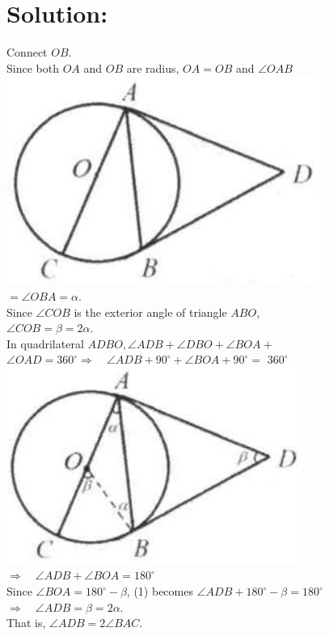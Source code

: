 \documentclass[10pt]{article}
\begin{document}
\section*{Solution:}
Connect \(O B\).\\
Since both \(O A\) and \(O B\) are radius, \(O A=O B\) and \(\angle O A B\)\\
\includegraphics[max width=\textwidth, center]{2025_04_17_97bc1f7e44d93c271a88g-147}\\
\(=\angle O B A=\alpha\).\\
Since \(\angle C O B\) is the exterior angle of triangle \(A B O\),\\
\(\angle C O B=\beta=2 \alpha\).\\
In quadrilateral \(A D B O, \angle A D B+\angle D B O+\angle B O A+\) \(\angle O A D=360^{\circ} \Rightarrow \quad \angle A D B+90^{\circ}+\angle B O A+90^{\circ}=\) \(360^{\circ}\)\\
\includegraphics[max width=\textwidth, center]{2025_04_17_97bc1f7e44d93c271a88g-147(3)}\\
\(\Rightarrow \quad \angle A D B+\angle B O A=180^{\circ}\)\\
Since \(\angle B O A=180^{\circ}-\beta\), (1) becomes \(\angle A D B+180^{\circ}-\beta=180^{\circ}\)\\
\(\Rightarrow \quad \angle A D B=\beta=2 \alpha\).\\
That is, \(\angle A D B=2 \angle B A C\).
\end{document}
